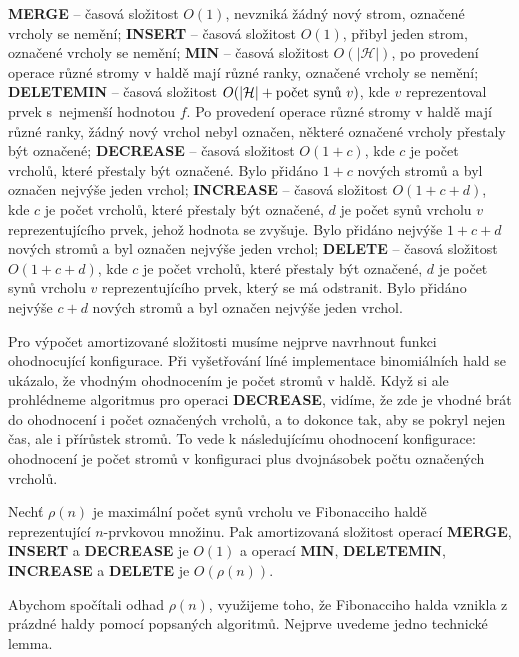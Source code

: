 \documentclass[a4paper,12pt]{article}
\begin{document}
{\bf MERGE} -- časová složitost $O(1)$, nevzniká žádný 
nový strom, 
ozna\-če\-né vrcholy se nemění;\newline 
{\bf INSERT} -- časová složitost $O(1)$, přibyl jeden strom, 
označené vrcholy se nemění;\newline 
{\bf MIN} -- časová složitost $O(|\mathcal H|)$, po provedení operace 
různé stro\-my v haldě mají různé 
ranky, označené vrcholy se nemění;\newline 
{\bf DELETEMIN} -- časová složitost $O(|\mathcal H|+\text{\rm počet synů }
v)$,
kde $v$ reprezentoval prvek s~nej\-menší hodnotou $f$. Po 
provedení ope\-ra\-ce různé stromy v haldě mají 
různé ranky, žádný nový vrchol nebyl 
označen, některé označené vrcholy přestaly být označené;\newline 
{\bf DECREASE} -- časová složitost $O(1+c)$, kde $c$ je počet 
vrcholů, které přestaly být označené. 
Bylo přidáno $1+c$ nových stromů a byl označen 
nejvýše jeden vrchol;\newline 
{\bf INCREASE} -- časová složitost $O(1+c+d)$, kde $c$ je počet 
vrcholů, které přestaly být označené, $d$ je 
počet synů vrcholu $v$ reprezentujícího prvek, 
jehož hodnota se zvyšuje. Bylo přidáno nejvýše $1
+c+d$ 
nových stromů a byl označen nejvýše jeden 
vrchol;\newline 
{\bf DELETE} -- časová složitost $O(1+c+d)$, kde $c$ je počet 
vrcholů, které přestaly být označené, $d$ je 
počet synů vrcholu $v$ reprezentujícího prvek, 
který se má odstranit. Bylo přidáno nejvýše $c+d$ 
nových stromů a byl označen nejvýše jeden 
vrchol.

Pro výpočet amortizované složitosti 
musíme nejprve navrhnout funkci ohodnocující 
konfigurace.  Při vyšetřování líné implementace binomiálních 
hald se ukázalo, že vhodným ohodnocením je počet stromů 
v haldě. Když si ale prohlédneme algoritmus pro operaci 
{\bf DECREASE}, vidíme, že zde je vhodné brát do ohodnocení i 
počet označených vrcholů, a to dokonce tak, aby 
se pokryl 
nejen čas, ale i přírůstek stromů. To vede k 
následujícímu ohodnocení konfigurace: ohodnocení je počet 
stromů v konfiguraci plus dvojnásobek počtu 
označených vrcholů.

Nechť $\rho (n)$ je maximální 
počet synů vrcholu ve Fibonacciho haldě 
reprezentující $n$-prvkovou množinu.  Pak amortizovaná 
složitost operací {\bf MERGE}, {\bf INSERT} a {\bf DECREASE} je $
O(1)$ a 
operací {\bf MIN}, {\bf DELETEMIN}, {\bf INCREASE} a {\bf DELETE} je $
O(\rho (n))$.

Abychom spočítali odhad $\rho (n)$, využijeme toho, že 
Fibonacciho halda vznikla z prázdné haldy pomocí 
popsaných algoritmů. Nejprve uvedeme jedno technické 
lemma.
\end{document}
